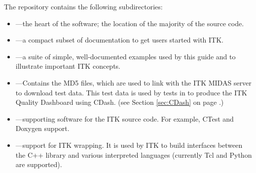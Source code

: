The  repository contains the following subdirectories:
\begin{itemize}
        \item {} ---the heart of the software; the location
        of the majority of the source code.
        \item {}---a compact subset of documentation
        to get users started with ITK.
        \item {}---a suite of simple, well-documented
        examples used by this guide and to illustrate important
        ITK concepts.
        \item {}---Contains the MD5 files, which are used
        to link with the ITK MIDAS server to download test data. This test data
        is used by tests in  to produce the ITK Quality Dashboard using CDash.
        (see Section \ref{sec:CDash} on
        page \pageref{sec:CDash}.)
        \item {}---supporting software for the ITK
        source code. For example, CTest and Doxygen support.
        \item {}---support for ITK wrapping.
        It is used by ITK to build interfaces between the C++ library and
        various interpreted languages (currently Tcl and Python are supported).
\end{itemize}

